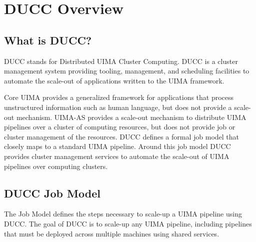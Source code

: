% 
% 
% 
% 
\ifpdf
\else
{}
\fi
\chapter{DUCC Overview}

    \section{What is DUCC?}

    DUCC stands for Distributed UIMA Cluster Computing. DUCC is a cluster management system
    providing tooling, management, and scheduling facilities to automate the scale-out of
    applications written to the UIMA framework.

    Core UIMA provides a generalized framework for applications that process unstructured
    information such as human language, but does not provide a scale-out mechanism. UIMA-AS provides
    a scale-out mechanism to distribute UIMA pipelines over a cluster of computing resources, but
    does not provide job or cluster management of the resources. DUCC defines a formal job model
    that closely maps to a standard UIMA pipeline. Around this job model DUCC provides cluster
    management services to automate the scale-out of UIMA pipelines over computing clusters.

    \section{DUCC Job Model}

    The Job Model defines the steps necessary to scale-up a UIMA pipeline using DUCC.  The goal of
    DUCC is to scale-up any UIMA pipeline, including pipelines that must be deployed across multiple
    machines using shared services.

